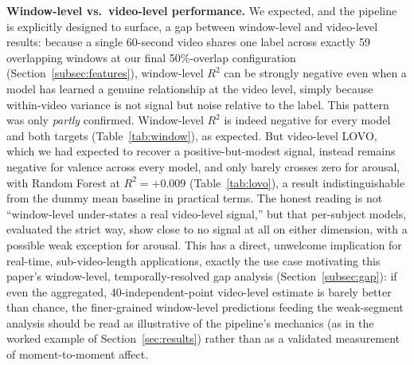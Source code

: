 \documentclass[conference]{IEEEtran}
\begin{document}
\textbf{Window-level vs.\ video-level performance.} We expected, and the
pipeline is explicitly designed to surface, a gap between window-level and
video-level results: because a single 60-second video shares one label
across exactly 59 overlapping windows at our final 50\%-overlap
configuration (Section~\ref{subsec:features}), window-level $R^2$ can be
strongly negative even when a model has learned a genuine relationship at
the video level, simply because within-video variance is not signal but
noise relative to the label. This pattern was only \emph{partly}
confirmed. Window-level $R^2$ is indeed negative for every model and both
targets (Table~\ref{tab:window}), as expected. But video-level LOVO,
which we had expected to recover a positive-but-modest signal, instead
remains negative for valence across every model, and only barely crosses
zero for arousal, with Random Forest at $R^2=+0.009$ (Table~\ref{tab:lovo}),
a result indistinguishable from the dummy mean baseline in practical
terms. The honest reading is not ``window-level under-states a real
video-level signal,'' but that per-subject models, evaluated the strict
way, show close to no signal at all on either dimension, with a possible
weak exception for arousal. This has a direct, unwelcome implication for
real-time, sub-video-length applications, exactly the use case motivating
this paper's window-level, temporally-resolved gap analysis
(Section~\ref{subsec:gap}): if even the aggregated, 40-independent-point
video-level estimate is barely better than chance, the finer-grained
window-level predictions feeding the weak-segment analysis should be
read as illustrative of the pipeline's mechanics (as in the worked example
of Section~\ref{sec:results}) rather than as a validated measurement of
moment-to-moment affect.
\end{document}
